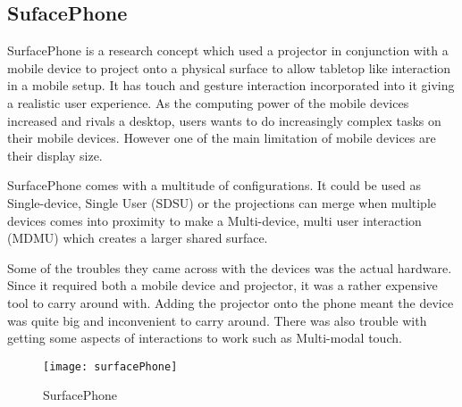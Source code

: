 

\subsection{SufacePhone}

SurfacePhone\cite{surfacephone} is a research concept which used
a projector in conjunction with a mobile device to project onto a
physical surface to allow tabletop like interaction in a mobile setup.
It has touch and gesture interaction incorporated into it giving a
realistic user experience. As the computing power of the mobile devices
increased and rivals a desktop, users wants to do increasingly complex
tasks on their mobile devices. However one of the main limitation
of mobile devices are their display size. 

SurfacePhone comes with a multitude of configurations. It could be
used as Single-device, Single User (SDSU) or the projections can merge
when multiple devices comes into proximity to make a Multi-device,
multi user interaction (MDMU) which creates a larger shared surface. 

Some of the troubles they came across with the devices was the actual
hardware. Since it required both a mobile device and projector, it
was a rather expensive tool to carry around with. Adding the projector
onto the phone meant the device was quite big and inconvenient to carry around. There was also
trouble with getting some aspects of interactions to work such as
Multi-modal touch.
\begin{figure}[H]
\centering
\texttt{[image: surfacePhone]}

\protect\caption{SurfacePhone}


\end{figure}

